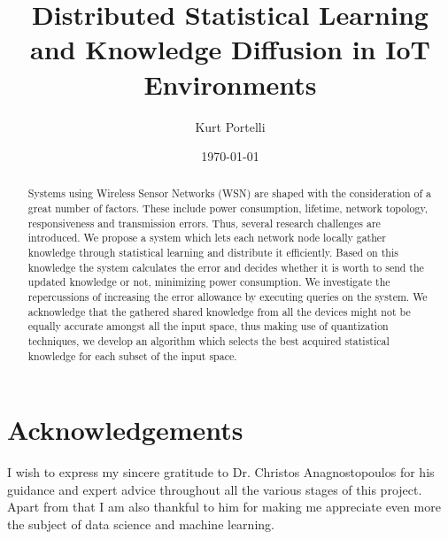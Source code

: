 \documentclass{mproj}
\begin{document}
\title{Distributed Statistical Learning and Knowledge Diffusion in IoT
Environments}
\author{Kurt Portelli}
\date{\today}
\maketitle



\begin{abstract}
Systems using Wireless Sensor Networks (WSN) are shaped with the consideration of a great number of factors. These include power consumption, lifetime, network topology, responsiveness and transmission errors. Thus, several research challenges are introduced. We propose a system which lets each network node locally gather knowledge through statistical learning and distribute it efficiently. Based on this knowledge the system calculates the error and decides whether it is worth to send the updated knowledge or not, minimizing power consumption. We investigate the repercussions of increasing the error allowance by executing queries on the system. We acknowledge that the gathered shared knowledge from all the devices might not be equally accurate amongst all the input space, thus making use of quantization techniques, we develop an algorithm which selects the best acquired statistical knowledge for each subset of the input space.
\end{abstract}

\educationalconsent


\newpage
\section*{Acknowledgements}
I wish to express my sincere gratitude to Dr. Christos Anagnostopoulos for his guidance and expert advice throughout all the various stages of this project. Apart from that I am also thankful to him for making me appreciate even more the subject of data science and machine learning.
\end{document}
